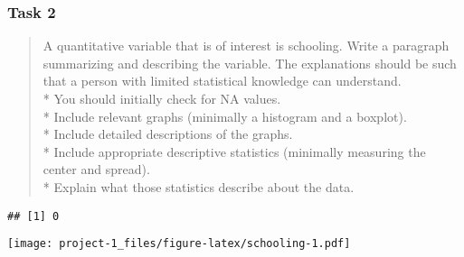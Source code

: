 \documentclass[
]{article}
\newenvironment{Shaded}{\begin{snugshade}}{\end{snugshade}}
\newcommand{\AttributeTok}[1]{\textcolor[rgb]{0.77,0.63,0.00}{#1}}
\newcommand{\ConstantTok}[1]{\textcolor[rgb]{0.00,0.00,0.00}{#1}}
\newcommand{\DecValTok}[1]{\textcolor[rgb]{0.00,0.00,0.81}{#1}}
\newcommand{\FunctionTok}[1]{\textcolor[rgb]{0.00,0.00,0.00}{#1}}
\newcommand{\NormalTok}[1]{#1}
\newcommand{\SpecialCharTok}[1]{\textcolor[rgb]{0.00,0.00,0.00}{#1}}
\newcommand{\StringTok}[1]{\textcolor[rgb]{0.31,0.60,0.02}{#1}}
\begin{document}
\hypertarget{task-2}{%
\subsubsection{Task 2}\label{task-2}}

\begin{quote}
A quantitative variable that is of interest is schooling. Write a
paragraph summarizing and describing the variable. The explanations
should be such that a person with limited statistical knowledge can
understand.\\
* You should initially check for NA values.\\
* Include relevant graphs (minimally a histogram and a boxplot).\\
* Include detailed descriptions of the graphs.\\
* Include appropriate descriptive statistics (minimally measuring the
center and spread).\\
* Explain what those statistics describe about the data.
\end{quote}

\begin{Shaded}
\end{Shaded}

\begin{verbatim}
## [1] 0
\end{verbatim}

\begin{Shaded}
\end{Shaded}

\texttt{[image: project-1\_files/figure-latex/schooling-1.pdf]}

\begin{Shaded}
\end{Shaded}
\end{document}
